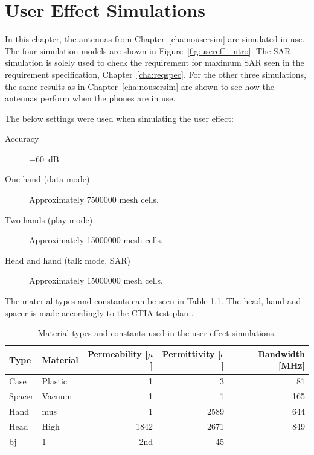 \chapter{User Effect Simulations}
\label{cha:usereff}
In this chapter, the antennas from Chapter~\ref{cha:nousersim} are simulated in use.
The four simulation models are shown in Figure~\ref{fig:usereff_intro}. The SAR simulation is solely used to check the requirement for maximum SAR seen in the requirement specification, Chapter~\ref{cha:reqspec}. For the other three simulations, the same results as in Chapter~\ref{cha:nousersim} are shown to see how the antennas perform when the phones are in use.

The below settings were used when simulating the user effect:
\begin{description}
\item[Accuracy] \SI{-60}{dB}.
\item[One hand (data mode)] Approximately \num{7500000} mesh cells.
\item[Two hands (play mode)] Approximately \num{15000000} mesh cells.
\item[Head and hand (talk mode, SAR)] Approximately \num{15000000} mesh cells.
\end{description}


The material types and constants can be seen in Table \ref{tab:cst_material}. The head, hand and spacer is made accordingly to the CTIA test plan \cite{cita2015}.
\begin{table}
  \centering
  \begin{tabular}{|l|l|r|r|r|}
    \hline
    Type & Material & Permeability [$\mu$] & Permittivity [$\epsilon$] & Bandwidth [MHz] \\
    \hline
    Case      & Plastic  & 1         & 3       & 81 \\
    Spacer    & Vacuum  & 1         & 1        & 165 \\
    Hand      & mus & 1        & 2589       & 644 \\
    Head      & High & 1842        & 2671       & 849 \\
      bj        & 1 & 2nd & 45 \\ 
    \hline
  \end{tabular}
  \caption{Material types and constants used in the user effect simulations.}
  \label{tab:cst_material}
\end{table}


